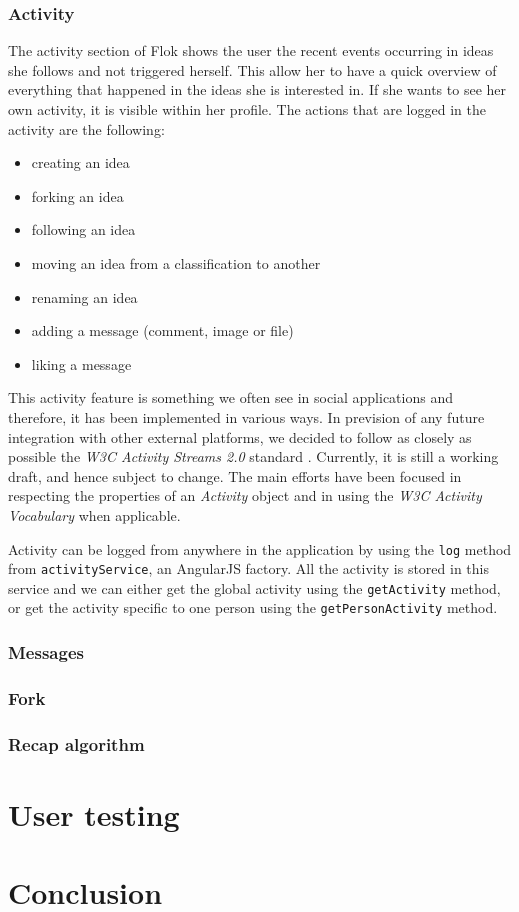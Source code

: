 \documentclass[a4paper,12pt, oneside]{article}
\begin{document}
\subsubsection{Activity}
The activity section of Flok shows the user the recent events occurring in ideas she follows and not triggered herself.
This allow her to have a quick overview of everything that happened in the ideas she is interested in.
If she wants to see her own activity, it is visible within her profile.
The actions that are logged in the activity are the following:
\begin{multicols}{2}
    \begin{itemize}
        \item creating an idea
        \item forking an idea
        \item following an idea
        \item moving an idea from a classification to another
        \item renaming an idea
        \item adding a message (comment, image or file)
        \item liking a message
    \end{itemize}
\end{multicols}

This activity feature is something we often see in social applications and therefore, it has been implemented in various ways.
In prevision of any future integration with other external platforms, we decided to follow as closely as possible the \emph{W3C Activity Streams 2.0} standard \cite{Snell2015AS2}.
Currently, it is still a working draft, and hence subject to change.
The main efforts have been focused in respecting the properties of an \emph{Activity} object and in using the \emph{W3C Activity Vocabulary} \cite{Snell2015AV} when applicable.

Activity can be logged from anywhere in the application by using the \texttt{log} method from \texttt{activityService}, an AngularJS factory.
All the activity is stored in this service and we can either get the global activity using the \texttt{getActivity} method, or get the activity specific to one person using the \texttt{getPersonActivity} method.

\subsubsection{Messages}
\subsubsection{Fork}
\subsubsection{Recap algorithm}

\section{User testing}

\section{Conclusion}

\clearpage


\end{document}

